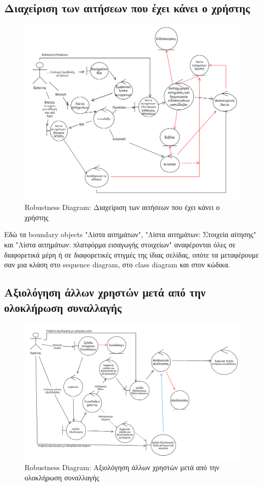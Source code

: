 \documentclass[12pt,a4paper]{article}
\begin{document}
\subsection{Διαχείριση των αιτήσεων που έχει κάνει ο χρήστης}
\begin{figure}[H]
	\includegraphics[width=\textwidth]{Manage User Requests Robustness.png}
	\caption{Robustness Diagram: Διαχείριση των αιτήσεων που έχει κάνει ο χρήστης}
	\label{Robustness Diagram: Διαχείριση των αιτήσεων που έχει κάνει ο χρήστης}
\end{figure}

Εδώ τα boundary objects "Λίστα αιτημάτων", "Λίστα αιτημάτων: Στοιχεία αίτησης" και "Λίστα αιτημάτων: πλατφόρμα εισαγωγής στοιχείων" αναφέρονται όλες σε διαφορετικά μέρη ή σε διαφορετικές στιγμές της ίδιας σελίδας, οπότε τα μεταφέρουμε σαν μια κλάση στο sequence diagram, στο class diagram και στον κώδικα.

\subsection{Αξιολόγηση άλλων χρηστών μετά από την ολοκλήρωση συναλλαγής}
\begin{figure}[H]
	\includegraphics[width=\textwidth]{Review after Transaction Robustness.png}
	\caption{Robustness Diagram: Αξιολόγηση άλλων χρηστών μετά από την ολοκλήρωση συναλλαγής}
	\label{Robustness Diagram: Αξιολόγηση άλλων χρηστών μετά από την ολοκλήρωση συναλλαγής}
\end{figure}
\end{document}
